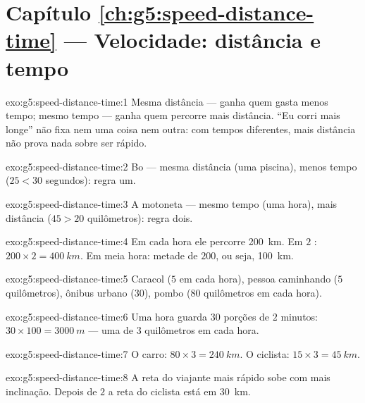 \section*{Capítulo \ref{ch:g5:speed-distance-time} --- Velocidade: distância e tempo}

\begin{solution}{exo:g5:speed-distance-time:1}
Mesma distância --- ganha quem gasta menos tempo; mesmo tempo ---
ganha quem percorre mais distância. ``Eu corri mais longe'' não fixa
nem uma coisa nem outra: com tempos diferentes, mais distância não
prova nada sobre ser rápido.
\end{solution}

\begin{solution}{exo:g5:speed-distance-time:2}
Bo --- mesma distância (uma piscina), menos tempo ($25 < 30$
segundos): regra um.
\end{solution}

\begin{solution}{exo:g5:speed-distance-time:3}
A motoneta --- mesmo tempo (uma hora), mais distância ($45 > 20$
quilômetros): regra dois.
\end{solution}

\begin{solution}{exo:g5:speed-distance-time:4}
Em cada hora ele percorre \qty{200}{km}. Em $2$ :
$200 \times 2 = \qty{400}{km}$. Em meia hora: metade de $200$, ou
seja, \qty{100}{km}.
\end{solution}

\begin{solution}{exo:g5:speed-distance-time:5}
Caracol ($5$  em cada hora), pessoa caminhando ($5$
quilômetros), ônibus urbano ($30$), pombo ($80$ quilômetros em cada
hora).
\end{solution}

\begin{solution}{exo:g5:speed-distance-time:6}
Uma hora guarda $30$ porções de $2$ minutos: $30 \times 100 =
\qty{3000}{m}$ --- uma  de $3$ quilômetros em cada hora.
\end{solution}

\begin{solution}{exo:g5:speed-distance-time:7}
O carro: $80 \times 3 = \qty{240}{km}$. O ciclista:
$15 \times 3 = \qty{45}{km}$.
\end{solution}

\begin{solution}{exo:g5:speed-distance-time:8}
A reta do viajante mais rápido sobe com mais inclinação. Depois de
$2$  a reta do ciclista está em \qty{30}{km}.
\end{solution}

